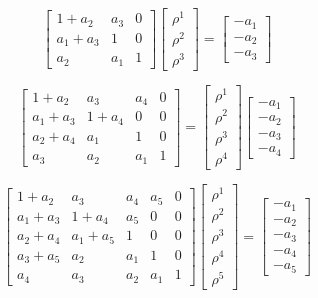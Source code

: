 \documentclass[12pt,letterpaper]{article}
\begin{document}
\[
\begin{bmatrix}
 1+a_2 & a_3 & 0 \\
 a_1+a_3 & 1 & 0 \\
 a_2 & a_1 & 1
\end{bmatrix}
\begin{bmatrix}
 \rho^1 \\
 \rho^2 \\
 \rho^3
\end{bmatrix}
=
\begin{bmatrix}
 -a_1 \\
 -a_2 \\
 -a_3
\end{bmatrix}
\]

\[
\begin{bmatrix}
 1+a_2 & a_3 & a_4 & 0 \\
 a_1+a_3 & 1+a_4 & 0 & 0 \\
 a_2+a_4 & a_1 & 1 & 0 \\
 a_3 & a_2 & a_1 & 1
\end{bmatrix}
=
\begin{bmatrix}
 \rho^1 \\
 \rho^2 \\
 \rho^3 \\
 \rho^4
\end{bmatrix}
\begin{bmatrix}
 -a_1 \\
 -a_2 \\
 -a_3 \\
 -a_4
\end{bmatrix}
\]

\[
\begin{bmatrix}
 1+a_2 & a_3 & a_4 & a_5 & 0 \\
 a_1+a_3 & 1+a_4 & a_5 & 0 & 0 \\
 a_2+a_4 & a_1+a_5 & 1 & 0 & 0 \\
 a_3+a_5 & a_2 & a_1 & 1 & 0 \\
 a_4 & a_3 & a_2 & a_1 & 1
\end{bmatrix}
\begin{bmatrix}
 \rho^1 \\
 \rho^2 \\
 \rho^3 \\
 \rho^4 \\
 \rho^5
\end{bmatrix}
=
\begin{bmatrix}
 -a_1 \\
 -a_2 \\
 -a_3 \\
 -a_4 \\
 -a_5
\end{bmatrix}
\]
\end{document}
